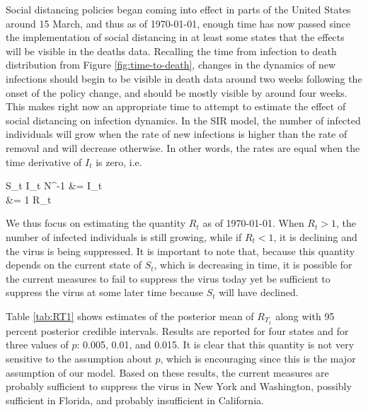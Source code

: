 \documentclass[11pt]{article}
\theoremstyle{plain}
\newcommand{\be}{\begin{equs}}
\newcommand{\ee}{\end{equs}}
\newcommand{\1}{\mathbf 1}
\begin{document}
Social distancing policies began coming into effect in parts of the United States around 15 March, and thus as of \today, enough time has now passed since the implementation of social distancing in at least some states that the effects will be visible in the deaths data. Recalling the time from infection to death distribution from Figure \ref{fig:time-to-death}, changes in the dynamics of new infections should begin to be visible in death data around two weeks following the onset of the policy change, and should be mostly visible by around four weeks. This makes right now an appropriate time to attempt to estimate the effect of social distancing on infection dynamics. In the SIR model, the number of infected individuals will grow when the rate of new infections is higher than the rate of removal and will decrease otherwise. In other words, the rates are equal when the time derivative of $I_t$ is zero, i.e.
\be
\phi \beta S_t I_t N^{-1} &= \gamma I_t \\
 &= 1 \equiv R_t
\ee
We thus focus on estimating the quantity $R_t$ as of \today. When $R_t>1$, the number of infected individuals is still growing, while if $R_t < 1$, it is declining and the virus is being suppressed. It is important to note that, because this quantity depends on the current state of $S_t$, which is decreasing in time, it is possible for the current measures to fail to suppress the virus today yet be sufficient to suppress the virus at some later time because $S_t$ will have declined.

Table \ref{tab:RT1} shows estimates of the posterior mean of $R_{T_1}$ along with 95 percent posterior credible intervals. Results are reported for four states and for three values of $p$: 0.005, 0.01, and 0.015. It is clear that this quantity is not very sensitive to the assumption about $p$, which is encouraging since this is the major assumption of our model. Based on these results, the current measures are probably sufficient to suppress the virus in New York and Washington, possibly sufficient in Florida, and probably insufficient in California. %

\begin{footnotesize}

\end{footnotesize}
\end{document}
